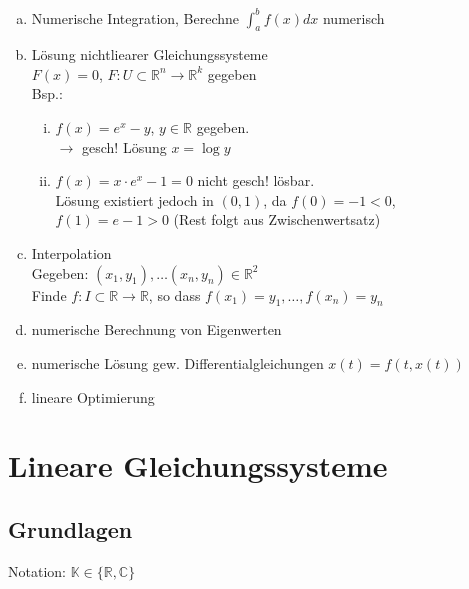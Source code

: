 \documentclass[a4paper]{scrartcl}
\begin{document}
\begin{enumerate}[(a)]
\item
Numerische Integration, Berechne $\int_a^b f(x) dx$ numerisch
\item
Lösung nichtliearer Gleichungssysteme \\
$F(x) = 0$, $F: U \subset \mathbb{R}^n \rightarrow \mathbb{R}^k$ gegeben \\
Bsp.:
\begin{enumerate}[(i)]
\item
$f(x)=e^x-y$, $y \in \mathbb{R}$ gegeben. \\
$\rightarrow$ gesch! Lösung $x = \log y$ 
\item
$f(x)=x \cdot e^x -1 = 0$ nicht gesch! lösbar. \\
Lösung existiert jedoch in $(0,1)$, da $f(0) = -1 < 0$, \\
$f(1)= e-1>0 $ (Rest folgt aus Zwischenwertsatz)
\end{enumerate}
\item
Interpolation \\
Gegeben: $(x_1,y_1), \dots (x_n,y_n) \in \mathbb{R}^2$\\
Finde $f: I \subset \mathbb{R} \rightarrow \mathbb{R}$, so dass 
$f(x_1) = y_1, \dots , f(x_n)=y_n$
\item
numerische Berechnung von Eigenwerten
\item
numerische Lösung gew. Differentialgleichungen $x(t)=f(t,x(t))$
\item
lineare Optimierung
\end{enumerate}

\section{Lineare Gleichungssysteme}
\subsection{Grundlagen}
Notation: $\mathbb{K} \in \{\mathbb{R}, \mathbb{C}\}$ \\
\end{document}
